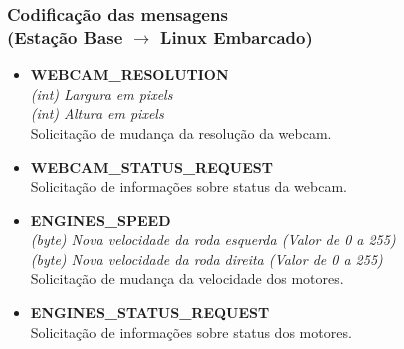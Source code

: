 \documentclass{beamer}
\begin{document}
	\begin{frame}
	\frametitle{Codificação das mensagens\\ (Estação Base $\rightarrow$ Linux Embarcado)}
		\begin{itemize}

		\item \textbf{WEBCAM\_RESOLUTION} \\
		\textit{(int) Largura em pixels }\\
		\textit{(int) Altura em pixels}\\
		Solicitação de mudança da resolução da webcam.

		\item \textbf{WEBCAM\_STATUS\_REQUEST}\\
		Solicitação de informações sobre status da webcam.

		\item \textbf{ENGINES\_SPEED} \\
		\textit{(byte) Nova velocidade da roda esquerda (Valor de 0 a 255) }\\
		\textit{(byte) Nova velocidade da roda direita (Valor de 0 a 255)}\\
		Solicitação de mudança da velocidade dos motores.

		\item \textbf{ENGINES\_STATUS\_REQUEST}\\
		Solicitação de informações sobre status dos motores.
		\end{itemize}
  \end{frame}
  
\end{document}
